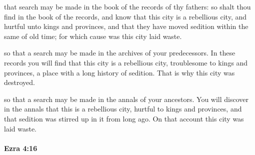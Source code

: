 			\begin{versebox}
					\item[BHS] 
					\item[LXX] 
					\item[ASV] that search may be made in the book of the records of thy fathers: so shalt thou find in the book of the records, and know that this city is a rebellious city, and hurtful unto kings and provinces, and that they have moved sedition within the same of old time; for which cause was this city laid waste.
					\item[NIV] so that a search may be made in the archives of your predecessors. In these records you will find that this city is a rebellious city, troublesome to kings and provinces, a place with a long history of sedition. That is why this city was destroyed.
					\item[NRSV] so that a search may be made in the annals of your ancestors. You will discover in the annals that this is a rebellious city, hurtful to kings and provinces, and that sedition was stirred up in it from long ago. On that account this city was laid waste.
			\end{versebox}

		\paragraph{Ezra 4:16} %
			\label{EZRA-4-16}

